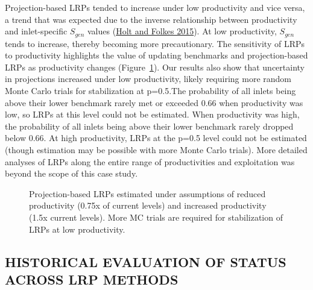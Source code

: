\documentclass[11pt]{book}
\begin{document}
Projection-based LRPs tended to increase under low productivity and vice versa, a trend that was expected due to the inverse relationship between productivity and inlet-specific \(S_{gen}\) values (\protect\hyperlink{ref-holtCautionsUsingPercentilebased2015}{Holt and Folkes 2015}). At low productivity, \(S_{gen}\) tends to increase, thereby becoming more precautionary. The sensitivity of LRPs to productivity highlights the value of updating benchmarks and projection-based LRPs as productivity changes (Figure~\ref{fig:chinook-projLRPsAlpha}). Our results also show that uncertainty in projections increased under low productivity, likely requiring more random Monte Carlo trials for stabilization at p=0.5.The probability of all inlets being above their lower benchmark rarely met or exceeded 0.66 when productivity was low, so LRPs at this level could not be estimated. When productivity was high, the probability of all inlets being above their lower benchmark rarely dropped below 0.66. At high productivity, LRPs at the p=0.5 level could not be estimated (though estimation may be possible with more Monte Carlo trials). More detailed analyses of LRPs along the entire range of productivities and exploitation was beyond the scope of this case study.
\begin{figure}[htb]

{\centering {} 

}

\caption{Projection-based LRPs estimated under assumptions of reduced productivity (0.75x of current levels) and increased productivity (1.5x current levels). More MC trials are required for stabilization of LRPs at low productivity.}\label{fig:chinook-projLRPsAlpha}
\end{figure}
\hypertarget{historical-evaluation-of-status-across-lrp-methods-1}{%
\subsection{HISTORICAL EVALUATION OF STATUS ACROSS LRP METHODS}\label{historical-evaluation-of-status-across-lrp-methods-1}}
\end{document}
